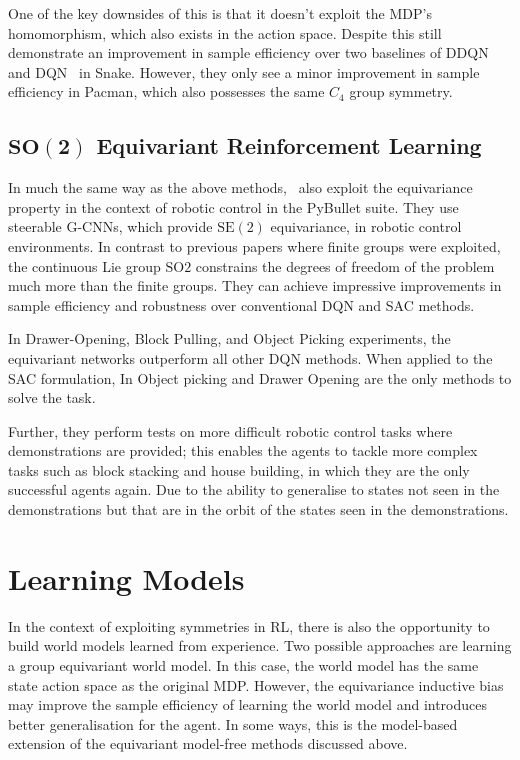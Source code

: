 One of the key downsides of this is that it doesn't exploit the MDP's homomorphism, which also exists in the action space. Despite this \cite{mondal2020group} still demonstrate an improvement in sample efficiency over two baselines of DDQN~\cite{van2016deep} and DQN~\cite{mnih2013playing} in Snake. However, they only see a minor improvement in sample efficiency in Pacman, which also possesses the same $C_4$ group symmetry.

\subsection{$\mathbf{\text{SO}(2)}$ Equivariant Reinforcement Learning}

In much the same way as the above methods,~\cite{wang2022so2} also exploit the equivariance property in the context of robotic control in the PyBullet suite\cite{coumans2021}. They use steerable G-CNNs\cite{weiler2019general}, which provide $\text{SE}(2)$ equivariance, in robotic control environments. In contrast to previous papers where finite groups were exploited, the continuous Lie group $\text{SO}2$ constrains the degrees of freedom of the problem much more than the finite groups. They can achieve impressive improvements in sample efficiency and robustness over conventional DQN and SAC methods.

In Drawer-Opening, Block Pulling, and Object Picking experiments, the equivariant networks outperform all other DQN methods. When applied to the SAC formulation, In Object picking and Drawer Opening are the only methods to solve the task.

Further, they perform tests on more difficult robotic control tasks where demonstrations are provided; this enables the agents to tackle more complex tasks such as block stacking and house building, in which they are the only successful agents again. Due to the ability to generalise to states not seen in the demonstrations but that are in the orbit of the states seen in the demonstrations.


\section{Learning Models}
In the context of exploiting symmetries in RL, there is also the opportunity to build world models learned from experience. Two possible approaches are learning a group equivariant world model. In this case, the world model has the same state action space as the original MDP. However, the equivariance inductive bias may improve the sample efficiency of learning the world model and introduces better generalisation for the agent. In some ways, this is the model-based extension of the equivariant model-free methods discussed above.

